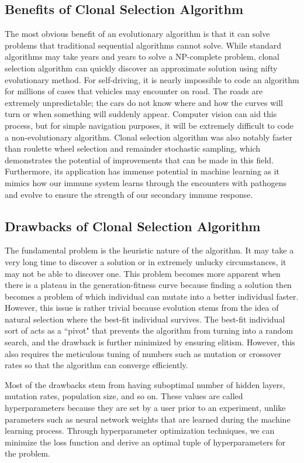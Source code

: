 \documentclass[]{interact}
\theoremstyle{plain} %
\theoremstyle{definition}
\theoremstyle{remark}
\begin{document}
\subsection{Benefits of Clonal Selection Algorithm}
The most obvious benefit of an evolutionary algorithm is that it can solve problems that traditional sequential algorithms cannot solve. While standard algorithms may take years and years to solve a NP-complete problem, clonal selection algorithm can quickly discover an approximate solution using nifty evolutionary method. For self-driving, it is nearly impossible to code an algorithm for millions of cases that vehicles may encounter on road. The roads are extremely unpredictable; the cars do not know where and how the curves will turn or when something will suddenly appear. Computer vision can aid this process, but for simple navigation purposes, it will be extremely difficult to code a non-evolutionary algorithm. Clonal selection algorithm was also notably faster than roulette wheel selection and remainder stochastic sampling, which demonstrates the potential of improvements that can be made in this field. Furthermore, its application has immense potential in machine learning as it mimics how our immune system learns through the encounters with pathogens and evolve to ensure the strength of our secondary immune response. 

\subsection{Drawbacks of Clonal Selection Algorithm}
The fundamental problem is the heuristic nature of the algorithm. It may take a very long time to discover a solution or in extremely unlucky circumstances, it may not be able to discover one. This problem becomes more apparent when there is a plateau in the generation-fitness curve because finding a solution then becomes a problem of which individual can mutate into a better individual faster. However, this issue is rather trivial because evolution stems from the idea of natural selection where the best-fit individual survives. The best-fit individual sort of acts as a ``pivot" that prevents the algorithm from turning into a random search, and the drawback is further minimized by ensuring elitism. However, this also requires the meticulous tuning of numbers such as mutation or crossover rates so that the algorithm can converge efficiently.

Most of the drawbacks stem from having suboptimal number of hidden layers, mutation rates, population size, and so on. These values are called hyperparameters because they are set by a user prior to an experiment, unlike parameters such as neural network weights that are learned during the machine learning process. Through hyperparameter optimization techniques, we can minimize the loss function and derive an optimal tuple of hyperparameters for the problem.
\end{document}
